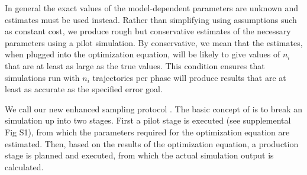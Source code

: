 In general the exact values of the model-dependent parameters are unknown and estimates must be used instead. Rather than simplifying using assumptions such as constant cost\supercite{Allen:2006ch,Borrero:2008il}, we produce rough but conservative estimates of the necessary parameters using a pilot simulation. By conservative, we mean that the estimates, when plugged into the optimization equation, will be likely to give values of $n_i$ that are at least as large as the true values. This condition ensures that simulations run with $n_i$ trajectories per phase will produce results that are at least as accurate as the specified error goal.

We call our new enhanced sampling protocol . The basic concept of  is to break an  simulation up into two stages. First a pilot stage is executed (see supplemental Fig S1), from which the parameters required for the optimization equation are estimated. Then, based on the results of the optimization equation, a production stage is planned and executed, from which the actual simulation output is calculated.

